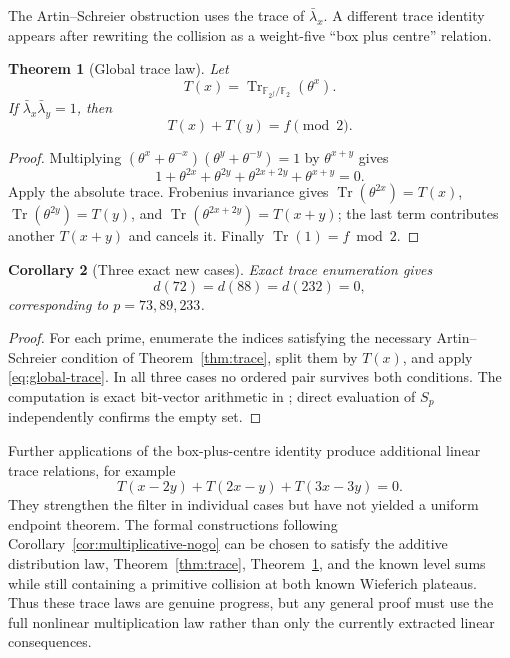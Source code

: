 \documentclass[a4paper]{article}
\newtheorem{theorem}{Theorem}[section]
\newtheorem{corollary}[theorem]{Corollary}
\newcommand{\F}{\mathbb{F}}
\DeclareMathOperator{\Tr}{Tr}
\begin{document}
The Artin--Schreier obstruction uses the trace of
$\bar\lambda_x$.  A different trace identity appears after rewriting the
collision as a weight-five ``box plus centre'' relation.

\begin{theorem}[Global trace law]\label{thm:global-trace}
	Let
	\[
		T(x)=\Tr_{\F_{2^f}/\F_2}(\theta^x).
	\]
	If $\bar\lambda_x\bar\lambda_y=1$, then
	\begin{equation}\label{eq:global-trace}
		T(x)+T(y)=f\pmod2.
	\end{equation}
\end{theorem}

\begin{proof}
	Multiplying
	$(\theta^x+\theta^{-x})(\theta^y+\theta^{-y})=1$
	by $\theta^{x+y}$ gives
	\[
		1+\theta^{2x}+\theta^{2y}
		+\theta^{2x+2y}+\theta^{x+y}=0.
	\]
	Apply the absolute trace.  Frobenius invariance gives
	$\Tr(\theta^{2x})=T(x)$,
	$\Tr(\theta^{2y})=T(y)$, and
	$\Tr(\theta^{2x+2y})=T(x+y)$; the last term contributes another
	$T(x+y)$ and cancels it.  Finally
	$\Tr(1)=f\bmod2$.
\end{proof}

\begin{corollary}[Three exact new cases]\label{cor:global-trace-cases}
	Exact trace enumeration gives
	\[
		d(72)=d(88)=d(232)=0,
	\]
	corresponding to $p=73,89,233$.
\end{corollary}

\begin{proof}
	For each prime, enumerate the indices satisfying the necessary
	Artin--Schreier condition of Theorem~\ref{thm:trace}, split them by
	$T(x)$, and apply \eqref{eq:global-trace}.  In all three cases no
	ordered pair survives both conditions.  The computation is exact
	bit-vector arithmetic in
	; direct evaluation of
	$S_p$ independently confirms the empty set.
\end{proof}

Further applications of the box-plus-centre identity produce additional
linear trace relations, for example
\[
	T(x-2y)+T(2x-y)+T(3x-3y)=0.
\]
They strengthen the filter in individual cases but have not yielded a
uniform endpoint theorem.  The formal constructions following
Corollary~\ref{cor:multiplicative-nogo} can be chosen to satisfy the
additive distribution law, Theorem~\ref{thm:trace},
Theorem~\ref{thm:global-trace}, and the known level sums while still
containing a primitive collision at both known Wieferich plateaus.  Thus
these trace laws are genuine progress, but any general proof must use the
full nonlinear multiplication law rather than only the currently extracted
linear consequences.
\end{document}
